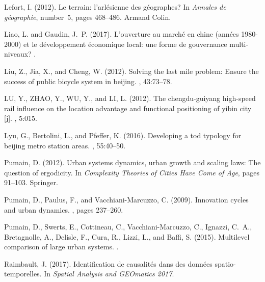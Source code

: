 \documentclass[11pt]{article}
\begin{document}
\begin{thebibliography}{}
Lefort, I. (2012).
\newblock Le terrain: l'arl{\'e}sienne des g{\'e}ographes?
\newblock In {\em Annales de g{\'e}ographie}, number~5, pages 468--486. Armand
  Colin.

Liao, L. and Gaudin, J.~P. (2017).
\newblock L'ouverture au march{\'e} en chine (ann{\'e}es 1980-2000) et le
  d{\'e}veloppement {\'e}conomique local: une forme de gouvernance
  multi-niveaux?
.

Liu, Z., Jia, X., and Cheng, W. (2012).
\newblock Solving the last mile problem: Ensure the success of public bicycle
  system in beijing.
, 43:73--78.

LU, Y., ZHAO, Y., WU, Y., and LI, L. (2012).
\newblock The chengdu-guiyang high-speed rail influence on the location
  advantage and functional positioning of yibin city [j].
, 5:015.

Lyu, G., Bertolini, L., and Pfeffer, K. (2016).
\newblock Developing a tod typology for beijing metro station areas.
, 55:40--50.

Pumain, D. (2012).
\newblock Urban systems dynamics, urban growth and scaling laws: The question
  of ergodicity.
\newblock In {\em Complexity Theories of Cities Have Come of Age}, pages
  91--103. Springer.

Pumain, D., Paulus, F., and Vacchiani-Marcuzzo, C. (2009).
\newblock Innovation cycles and urban dynamics.
, pages
  237--260.

Pumain, D., Swerts, E., Cottineau, C., Vacchiani-Marcuzzo, C., Ignazzi, C.~A.,
  Bretagnolle, A., Delisle, F., Cura, R., Lizzi, L., and Baffi, S. (2015).
\newblock Multilevel comparison of large urban systems.
.

Raimbault, J. (2017).
\newblock Identification de causalit{\'e}s dans des donn{\'e}es
  spatio-temporelles.
\newblock In {\em Spatial Analysis and GEOmatics 2017}.


\end{thebibliography}
\end{document}
